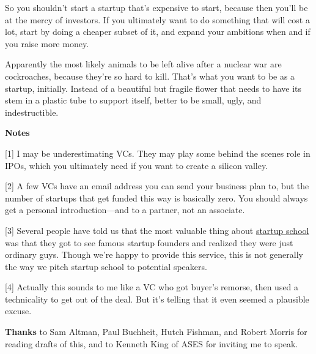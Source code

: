 So you shouldn't start a startup that's expensive to start, because then
you'll be at the mercy of investors. If you ultimately want to do
something that will cost a lot, start by doing a cheaper subset of it,
and expand your ambitions when and if you raise more money.

Apparently the most likely animals to be left alive after a nuclear war
are cockroaches, because they're so hard to kill. That's what you want
to be as a startup, initially. Instead of a beautiful but fragile flower
that needs to have its stem in a plastic tube to support itself, better
to be small, ugly, and indestructible.

\textbf{Notes}

{[}1{]} I may be underestimating VCs. They may play some behind the
scenes role in IPOs, which you ultimately need if you want to create a
silicon valley.

{[}2{]} A few VCs have an email address you can send your business plan
to, but the number of startups that get funded this way is basically
zero. You should always get a personal introduction---and to a partner,
not an associate.

{[}3{]} Several people have told us that the most valuable thing about
\href{http://startupschool.org}{startup school} was that they got to see
famous startup founders and realized they were just ordinary guys.
Though we're happy to provide this service, this is not generally the
way we pitch startup school to potential speakers.

{[}4{]} Actually this sounds to me like a VC who got buyer's remorse,
then used a technicality to get out of the deal. But it's telling that
it even seemed a plausible excuse.

\textbf{Thanks} to Sam Altman, Paul Buchheit, Hutch Fishman, and Robert
Morris for reading drafts of this, and to Kenneth King of ASES for
inviting me to speak.
